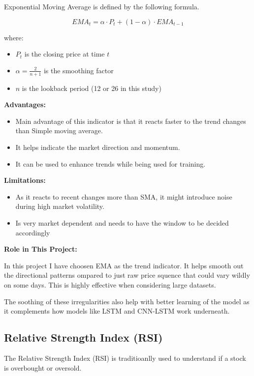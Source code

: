 Exponential Moving Average is defined by the following formula.

\begin{equation}
EMA_t = \alpha \cdot P_t + (1 - \alpha) \cdot EMA_{t-1}
\end{equation}

where:
\begin{itemize}
    \item $P_t$ is the closing price at time $t$
    \item $\alpha = \frac{2}{n+1}$ is the smoothing factor
    \item $n$ is the lookback period (12 or 26 in this study)
\end{itemize}

\textbf{Advantages:}
\begin{itemize}
    \item Main advantage of this indicator is that it reacts faster to the trend changes than Simple moving average.
    \item It helps indicate the market direction and momentum.
    \item It can be used to enhance trends while being used for training.
\end{itemize}

\textbf{Limitations:}
\begin{itemize}
    \item As it reacts to recent changes more than SMA, it might introduce noise during high market volatility.
    \item Is very market dependent and needs to have the window to be decided accordingly
\end{itemize}

\textbf{Role in This Project:}  

In this project I have choosen EMA as the trend indicator. It helps smooth out the directional patterns ompared to just raw price squence that could vary wildly on some days. This is highly effective when considering large datasets.

The soothing of these irregularities also help with better learning of the model as it complements how models like LSTM and CNN-LSTM work underneath.

\subsection{Relative Strength Index (RSI)}

The Relative Strength Index (RSI) is traditioanlly used to understand if a stock is overbought or oversold.

